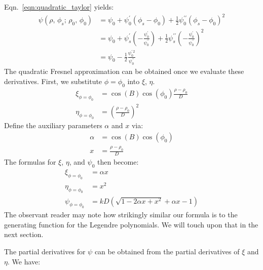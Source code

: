 \documentclass{article}
\begin{document}
        Eqn.~\ref{eqn:quadratic_taylor} yields:
        \begin{align}
            \psi(\rho,\,\phi_{s};\,\rho_{0},\,\phi_{0})
            &=\psi_{0}+\psi^{\prime}_{0}(\phi_{s}-\phi_{0})
                +\frac{1}{2}\psi^{\prime\prime}_{0}(\phi_{s}-\phi_{0})^{2}\\
            &=\psi_{0}+\psi^{\prime}_{s}\left(
                -\frac{\psi^{\prime}_{0}}{\psi^{\prime\prime}_{0}}
            \right)+
            \frac{1}{2}\psi^{\prime\prime}_{s}\left(
                -\frac{\psi^{\prime}_{0}}{\psi^{\prime\prime}_{0}}
            \right)^{2}\\
            &=\psi_{0}
                -\frac{1}{2}
                \frac{\psi^{\prime\,2}_{0}}{\psi^{\prime\prime}_{0}}
        \end{align}
        The quadratic Fresnel approximation can be obtained once we
        evaluate these derivatives. First, we substitute $\phi=\phi_{0}$
        into $\xi$, $\eta$.
        \begin{align}
            \xi_{\phi=\phi_{0}}
            &=\cos(B)\cos(\phi_{0})\frac{\rho-\rho_{0}}{D}\\
            \eta_{\phi=\phi_{0}}
            &=\left(\frac{\rho-\rho_{0}}{D}\right)^{2}
        \end{align}
        Define the auxiliary parameters $\alpha$ and $x$ via:
        \begin{align}
            \alpha&=\cos(B)\cos(\phi_{0})\\
            x&=\frac{\rho-\rho_{0}}{D}
        \end{align}
        The formulas for $\xi$, $\eta$, and $\psi_{0}$ then become:
        \begin{align}
            \xi_{\phi=\phi_{0}}
            &=\alpha{x}\\
            \eta_{\phi=\phi_{0}}
            &=x^{2}\\
            \psi_{\phi=\phi_{0}}
            &=kD\left(
                \sqrt{1-2\alpha{x}+x^{2}}
                +\alpha{x}-1
            \right)
        \end{align}
        The observant reader may note how strikingly similar our formula is
        to the generating function for the Legendre polynomials. We will
        touch upon that in the next section.
        \par\hfill\par
        The partial derivatives for $\psi$ can be obtained from the partial
        derivatives of $\xi$ and $\eta$. We have:
\end{document}
